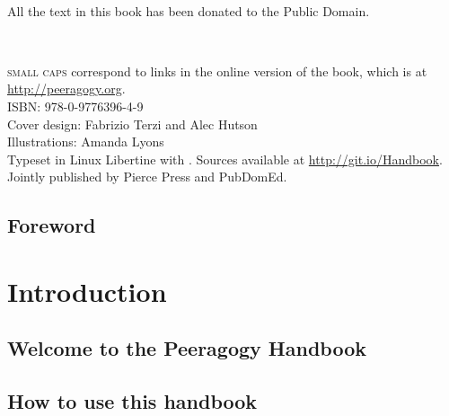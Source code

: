 \documentclass[ebook, 12pt, twoside]{memoir}
\newcommand\blankpage{%
    \null
    \thispagestyle{empty}%
    \addtocounter{page}{-1}%
    \newpage}
\let\sc\scshape
\let\sc\scshape
\begin{document}
\quad \\[3in] 
\begin{center}
{\large All the text in this book has been donated to the Public Domain.}
\end{center}
\quad \\
\begin{center}
{\large {\sc small caps} correspond to links in the online version of
  the book, which is at \url{http://peeragogy.org}.}
\quad \\[3in] 
\large{ISBN: 978-0-9776396-4-9}
\quad \\[.2in] 
\large{Cover design: Fabrizio Terzi and Alec Hutson \\
Illustrations: Amanda Lyons}
\quad \\[.2in]
\large{Typeset in Linux Libertine with \XeLaTeX.
Sources available at \url{http://git.io/Handbook}.}
\quad \\[.2in]
\large{Jointly published by Pierce Press and PubDomEd.}
\end{center}
\thispagestyle{empty}
\cleardoublepage

\frontmatter
\pagestyle{empty}
\thispagestyle{empty}
\setcounter{page}{-1}
{
\changepage{10mm}{}{}{}{}{-10mm}{}{}{}{}{}{}{}{}
\tableofcontents*
}

\mainmatter

{}
\chapter*{Foreword}
%


\part{Introduction} \label{intro-part} %
\pagestyle{companion}
\chapter[\textbf{Welcome!}]{Welcome to the Peeragogy Handbook}
%

%
\chapter[\textbf{How to use this handbook}]{How to use this handbook}
%

\end{document}
